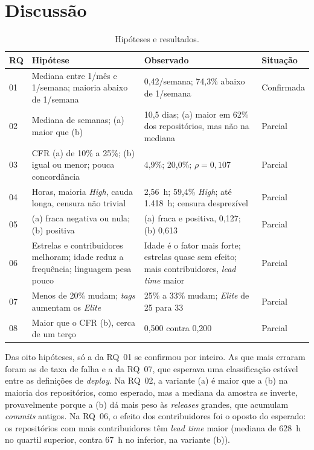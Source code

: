 
\section{Discussão}

\begin{table}[ht]
\centering
\caption{Hipóteses e resultados.}
\label{tab:hipoteses}
\footnotesize
\setlength{\tabcolsep}{3pt}
\begin{tabular}{@{}lp{6.0cm}p{6.0cm}l@{}}
\hline
\textbf{RQ} & \textbf{Hipótese} & \textbf{Observado} & \textbf{Situação} \\
\hline
01 & Mediana entre 1/mês e 1/semana; maioria abaixo de 1/semana & 0,42/semana; 74,3\% abaixo de 1/semana & Confirmada \\
02 & Mediana de semanas; (a) maior que (b) & 10,5 dias; (a) maior em 62\% dos repositórios, mas não na mediana & Parcial \\
03 & CFR (a) de 10\% a 25\%; (b) igual ou menor; pouca concordância & 4,9\%; 20,0\%; $\rho = 0{,}107$ & Parcial \\
04 & Horas, maioria \textit{High}, cauda longa, censura não trivial & 2,56~h; 59,4\% \textit{High}; até 1.418~h; censura desprezível & Parcial \\
05 & (a) fraca negativa ou nula; (b) positiva & (a) fraca e positiva, 0,127; (b) 0,613 & Parcial \\
06 & Estrelas e contribuidores melhoram; idade reduz a frequência; linguagem pesa pouco & Idade é o fator mais forte; estrelas quase sem efeito; mais contribuidores, \textit{lead time} maior & Parcial \\
07 & Menos de 20\% mudam; \textit{tags} aumentam os \textit{Elite} & 25\% a 33\% mudam; \textit{Elite} de 25 para 33 & Parcial \\
08 & Maior que o CFR (b), cerca de um terço & 0,500 contra 0,200 & Parcial \\
\hline
\end{tabular}
\end{table}

Das oito hipóteses, só a da RQ~01 se confirmou por inteiro. As que mais erraram foram as de
taxa de falha e a da RQ~07, que esperava uma classificação estável entre as definições de
\textit{deploy}. Na RQ~02, a variante (a) é maior que a (b) na maioria dos repositórios, como
esperado, mas a mediana da amostra se inverte, provavelmente porque a (b) dá mais peso às \textit{releases}
grandes, que acumulam \textit{commits} antigos. Na RQ~06, o efeito dos contribuidores foi o
oposto do esperado: os repositórios com mais contribuidores têm \textit{lead time} maior
(mediana de 628~h no quartil superior, contra 67~h no inferior, na variante (b)).

